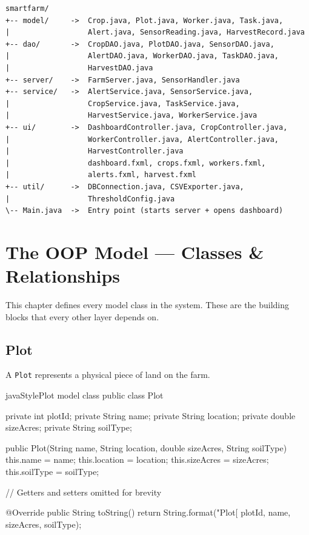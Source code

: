 \documentclass[12pt, a4paper]{report}
\begin{document}
\begin{tcolorbox}[colback=codebg, colframe=gray, fontupper=\ttfamily\small\color{codetext}]
\begin{verbatim}
smartfarm/
+-- model/     ->  Crop.java, Plot.java, Worker.java, Task.java,
|                  Alert.java, SensorReading.java, HarvestRecord.java
+-- dao/       ->  CropDAO.java, PlotDAO.java, SensorDAO.java,
|                  AlertDAO.java, WorkerDAO.java, TaskDAO.java,
|                  HarvestDAO.java
+-- server/    ->  FarmServer.java, SensorHandler.java
+-- service/   ->  AlertService.java, SensorService.java,
|                  CropService.java, TaskService.java,
|                  HarvestService.java, WorkerService.java
+-- ui/        ->  DashboardController.java, CropController.java,
|                  WorkerController.java, AlertController.java,
|                  HarvestController.java
|                  dashboard.fxml, crops.fxml, workers.fxml,
|                  alerts.fxml, harvest.fxml
+-- util/      ->  DBConnection.java, CSVExporter.java,
|                  ThresholdConfig.java
\-- Main.java  ->  Entry point (starts server + opens dashboard)
\end{verbatim}
\end{tcolorbox}


\chapter{The OOP Model --- Classes \& Relationships}

This chapter defines every model class in the system. These are the building blocks that every other layer depends on.

\section{Plot}

A \texttt{Plot} represents a physical piece of land on the farm.

\begin{codeblock}{javaStyle}{Plot model class}
public class Plot {
    private int    plotId;
    private String name;
    private String location;
    private double sizeAcres;
    private String soilType;

    public Plot(String name, String location, double sizeAcres, String soilType) {
        this.name      = name;
        this.location  = location;
        this.sizeAcres = sizeAcres;
        this.soilType  = soilType;
    }

    // Getters and setters omitted for brevity

    @Override
    public String toString() {
        return String.format("Plot[%
               plotId, name, sizeAcres, soilType);
    }
}
\end{codeblock}
\end{document}
